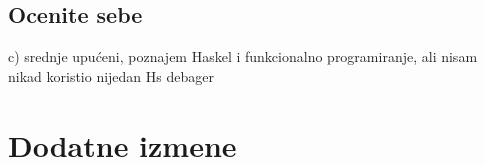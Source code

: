 \documentclass[a4paper]{report}
\begin{document}
\section{Ocenite sebe}
c) srednje upućeni, poznajem Haskel i funkcionalno programiranje, ali nisam nikad koristio nijedan Hs debager



\chapter{Dodatne izmene}
\end{document}
